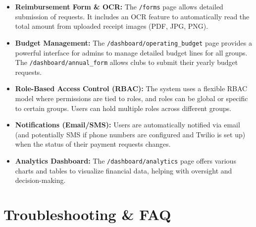 \documentclass{article}
\begin{document}
\begin{itemize}
    \item \textbf{Reimbursement Form \& OCR:} The \texttt{/forms} page allows detailed submission of requests. It includes an OCR feature to automatically read the total amount from uploaded receipt images (PDF, JPG, PNG).
    \item \textbf{Budget Management:} The \texttt{/dashboard/operating\_budget} page provides a powerful interface for admins to manage detailed budget lines for all groups. The \texttt{/dashboard/annual\_form} allows clubs to submit their yearly budget requests.
    \item \textbf{Role-Based Access Control (RBAC):} The system uses a flexible RBAC model where permissions are tied to roles, and roles can be global or specific to certain groups. Users can hold multiple roles across different groups.
    \item \textbf{Notifications (Email/SMS):} Users are automatically notified via email (and potentially SMS if phone numbers are configured and Twilio is set up) when the status of their payment requests changes.
    \item \textbf{Analytics Dashboard:} The \texttt{/dashboard/analytics} page offers various charts and tables to visualize financial data, helping with oversight and decision-making.
\end{itemize}

\section{Troubleshooting \& FAQ}
\end{document}
